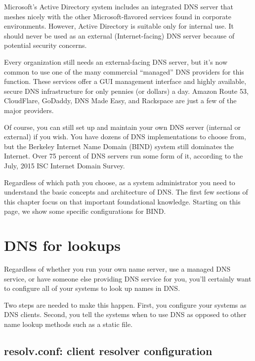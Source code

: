 Microsoft's Active Directory system includes an integrated DNS server that meshes nicely with the other Microsoft-flavored services found in corporate environments.
However, Active Directory is suitable only for internal use.
It should never be used as an external (Internet-facing) DNS server because of potential security concerns.

Every organization still needs an external-facing DNS server, but it's now common to use one of the many commercial ``managed'' DNS providers for this function.
These services offer a GUI management interface and highly available, secure DNS infrastructure for only pennies (or dollars) a day.
Amazon Route 53, CloudFlare, GoDaddy, DNS Made Easy, and Rackspace are just a few of the major providers.

Of course, you can still set up and maintain your own DNS server
(internal or external) if you wish. You have dozens of DNS
implementations to choose from, but the Berkeley Internet Name Domain (BIND) system still dominates the Internet.
Over 75 percent of DNS servers run some form of it, according to the July, 2015 ISC Internet Domain Survey.

Regardless of which path you choose, as a system administrator you need to understand the basic concepts and architecture of DNS.
The first few sections of this chapter focus on that important foundational knowledge.
Starting on this page, we show some specific configurations for BIND.


\section{DNS for lookups}

Regardless of whether you run your own name server, use a managed DNS service, or have someone else providing DNS service for you, you'll certainly want
to configure all of your systems to look up names in DNS.

Two steps are needed to make this happen. First, you configure your
systems as DNS clients. Second, you tell the systems when to use DNS as
opposed to other name lookup methods such as a static  file.


\subsection{resolv.conf: client resolver configuration}

